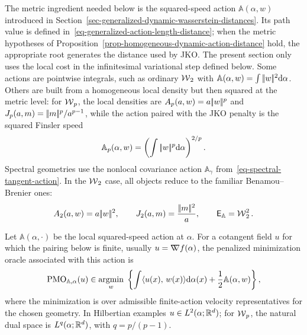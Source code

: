 The metric ingredient needed below is the squared-speed action $\mathbb A(\alpha,w)$ introduced in Section~\ref{sec-generalized-dynamic-wasserstein-distances}. Its path value is defined in~\eqref{eq-generalized-action-length-distance}; when the metric hypotheses of Proposition~\ref{prop-homogeneous-dynamic-action-distance} hold, the appropriate root generates the distance used by JKO. The present section only uses the local cost in the infinitesimal variational step defined below. Some actions are pointwise integrals, such as ordinary $\operatorname{\mathcal{W}}_2$ with $\mathbb A(\alpha,w)=\int|\!| w |\!|^2\mathrm{d}\alpha$. Others are built from a homogeneous local density but then squared at the metric level: for $\operatorname{\mathcal{W}}_p$, the local densities are \(A_p(a,w)=a|\!| w |\!|^p\) and \(J_p(a,m)=|\!| m |\!|^p/a^{p-1}\), while the action paired with the JKO penalty is the squared Finsler speed
\[
	\mathbb A_p(\alpha,w)=\left(\int|\!| w |\!|^p\mathrm{d}\alpha\right)^{2/p}.
\]
Spectral geometries use the nonlocal covariance action \(\mathbb A_\gamma\) from~\eqref{eq-spectral-tangent-action}.
In the \(\operatorname{\mathcal{W}}_2\) case, all objects reduce to the familiar Benamou--Brenier ones:
\[
	A_2(a,w)=a|\!| w |\!|^2,
	\qquad
	J_2(a,m)=\frac{|\!| m |\!|^2}{a},
	\qquad
	\mathsf E_{\mathbb A}=\operatorname{\mathcal{W}}_2^2.
\]

\begin{defn}\label{def-generalized-action-steepest-direction}
	Let \(\mathbb A(\alpha,\cdot)\) be the local squared-speed action at \(\alpha\). For a cotangent field \(u\) for which the pairing below is finite, usually \(u=\mathord{\nabla\mkern-9.3mu\nabla} f(\alpha)\), the penalized minimization oracle associated with this action is
	\begin{equation}\label{eq-local-action-steepest-descent}
		\operatorname{PMO}_{\mathbb A,\alpha}(u)
		\in
		\underset{w}{\operatorname{argmin}}\;
		\left\{
		\int \langle u(x),\,w(x)\rangle\mathrm{d}\alpha(x)
		+
		\frac12\mathbb A(\alpha,w)
		\right\},
	\end{equation}
	where the minimization is over admissible finite-action velocity representatives for the chosen geometry. In Hilbertian examples \(u\in L^2(\alpha;\mathbb{R}^d)\); for \(\operatorname{\mathcal{W}}_p\), the natural dual space is \(L^q(\alpha;\mathbb{R}^d)\), with \(q=p/(p-1)\).
\end{defn}

